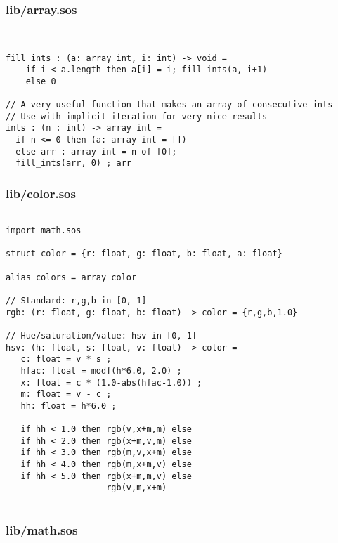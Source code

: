 \documentclass[main.tex]{subfiles}
\begin{document}
\subsubsection{lib/array.sos}

\begin{lstlisting}


fill_ints : (a: array int, i: int) -> void = 
    if i < a.length then a[i] = i; fill_ints(a, i+1)
    else 0

// A very useful function that makes an array of consecutive ints
// Use with implicit iteration for very nice results
ints : (n : int) -> array int = 
  if n <= 0 then (a: array int = [])
  else arr : array int = n of [0];
  fill_ints(arr, 0) ; arr
\end{lstlisting}

\subsubsection{lib/color.sos}

\begin{lstlisting}

import math.sos

struct color = {r: float, g: float, b: float, a: float}

alias colors = array color

// Standard: r,g,b in [0, 1]
rgb: (r: float, g: float, b: float) -> color = {r,g,b,1.0}

// Hue/saturation/value: hsv in [0, 1]
hsv: (h: float, s: float, v: float) -> color =
   c: float = v * s ;
   hfac: float = modf(h*6.0, 2.0) ;
   x: float = c * (1.0-abs(hfac-1.0)) ;
   m: float = v - c ;
   hh: float = h*6.0 ;

   if hh < 1.0 then rgb(v,x+m,m) else
   if hh < 2.0 then rgb(x+m,v,m) else
   if hh < 3.0 then rgb(m,v,x+m) else
   if hh < 4.0 then rgb(m,x+m,v) else
   if hh < 5.0 then rgb(x+m,m,v) else
                    rgb(v,m,x+m)
    
\end{lstlisting}

\subsubsection{lib/math.sos}
\end{document}
